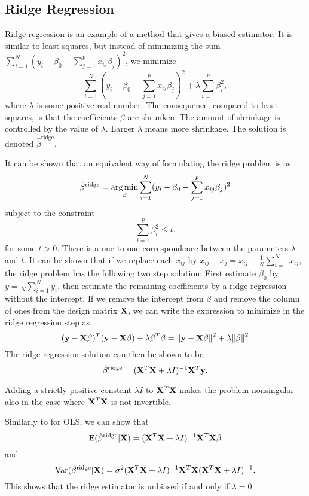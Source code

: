\subsection{Ridge Regression}\label{sec:Ridge theory}
Ridge regression is an example of a method that gives a biased estimator. It is similar to least squares, but instead of minimizing the sum $\sum_{i=1}^N(y_i-\beta_0-\sum_{j=1}^px_{ij}\beta_j)^2$, we minimize 
\begin{equation}\label{eq:ridge}
    \sum_{i=1}^N(y_i-\beta_0-\sum_{j=1}^px_{ij}\beta_j)^2+\lambda\sum_{i=1}^p\beta_i^2,
\end{equation}
where $\lambda$ is some positive real number. The consequence, compared to least squares, is that the coefficients $\beta$ are shrunken. The amount of shrinkage is controlled by the value of $\lambda$. Larger $\lambda$ means more shrinkage. The solution is denoted $\hat{\beta}^{\text{ridge}}$.

It can be shown that an equivalent way of formulating the ridge problem is as
\[\label{ridge formula}
\hat{\beta}^{\text{ridge}}=\operatorname*{arg\,min}_{\beta}\sum_{i=1}^N(y_i-\beta_0-\sum_{j=1}^px_{ij}\beta_j)^2
\]
subject to the constraint
\[
\sum_{i=1}^p\beta_i^2\le t.
\]
 for some $t>0$. There is a one-to-one correspondence between the parameters $\lambda$ and $t$. It can be shown \cite[Exercise 3.5]{ESL} that if we replace each $x_{ij}$ by $x_{ij}-\overline{x}_j=x_{ij}-\frac{1}{N}\sum_{i=1}^Nx_{ij}$, the ridge problem has the following two step solution: First estimate $\beta_0$ by $\overline{y}=\frac{1}{N}\sum_{i=1}^Ny_i$, then estimate the remaining coefficients by a ridge regression without the intercept. If we remove the intercept from $\beta$ and remove the column of ones from the design matrix $\mathbf{X}$, we can write the expression to minimize in the ridge regression step as
 \[
 (\mathbf{y}-\mathbf{X}\beta)^T(\mathbf{y}-\mathbf{X}\beta)+\lambda\beta^T\beta = \norm{\mathbf{y}-\mathbf{X}\beta}^2+\lambda\norm{\beta}^2
 \]
 The ridge regression solution can then be shown to be
 \begin{equation}\label{eq:ridge_fit}
     \hat{\beta}^{\text{ridge}} = (\mathbf{X}^T\mathbf{X}+\lambda I)^{-1}\mathbf{X}^T\mathbf{y}.
 \end{equation}
 
 
 Adding a strictly positive constant $\lambda I$ to $\mathbf{X}^T\mathbf{X}$ makes the problem nonsingular also in the case where $\mathbf{X}^T\mathbf{X}$ is not invertible.
 
 Similarly to for OLS, we can show that
 \begin{equation*}
     \mathrm{E}(\hat{\beta}^{\text{ridge}}|\mathbf{X}) = (\mathbf{X}^T\mathbf{X}+\lambda I)^{-1}\mathbf{X}^T\mathbf{X}\beta
 \end{equation*}
 and
 \begin{equation}\label{eq:ridge_var}
     \mathrm{Var}(\hat{\beta}^{\text{ridge}}|\mathbf{X}) = \sigma^2(\mathbf{X}^T\mathbf{X}+\lambda I)^{-1}\mathbf{X}^T\mathbf{X}(\mathbf{X}^T\mathbf{X}+\lambda I)^{-1}.
 \end{equation}
 This shows that the ridge estimator is unbiased if and only if $\lambda=0$.
 
